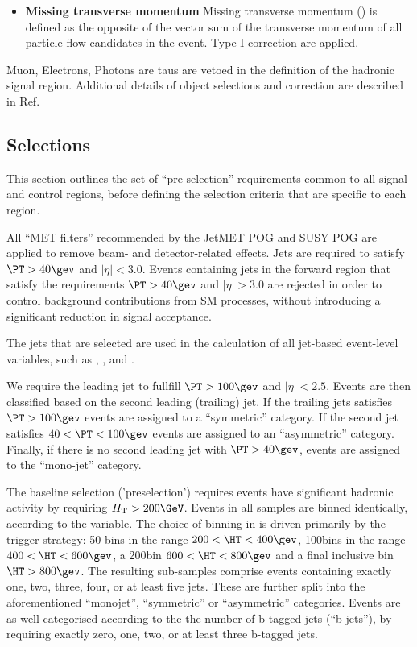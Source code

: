 \begin{itemize}
 \item{\bf Missing transverse momentum} Missing transverse momentum (\met) is defined as the opposite of the vector sum of the transverse momentum of all particle-flow candidates in the event. Type-I \met correction \cite{Khachatryan:2014gga} are applied.


\end{itemize}


Muon, Electrons, Photons are taus are vetoed in the definition of the hadronic signal region. Additional details of object selections and correction are described in Ref.~\cite{alphaTnote}

\subsection{Selections}


This section outlines the set of ``pre-selection'' requirements common to all signal and control regions, before defining the selection criteria that are specific to each region. 


All ``MET filters'' recommended by the JetMET POG and SUSY POG are applied to remove beam- and detector-related effects. Jets are required to satisfy $\PT>40\gev$ and $|\eta|<3.0$. Events containing jets in the forward region that satisfy the requirements $\PT>40\gev$ and $|\eta|>3.0$ are rejected in order to control background contributions from SM processes, without introducing a significant reduction in signal acceptance. 

The jets that are selected are used in the calculation of all jet-based event-level variables, such as \HT, \mht, and \alphat.

We require the leading jet to fullfill $\PT > 100\gev$ and $|\eta|<2.5$.  Events are then classified based on the second leading (trailing) jet. 
If the trailing jets satisfies $\PT > 100\gev$  events are assigned to a ``symmetric'' \njet category. If the second
jet satisfies $40 < \PT < 100\gev$ events are assigned to an ``asymmetric'' \njet category. Finally, if there is no second leading
jet with $\PT>40\gev$, events are assigned to the ``mono-jet'' category. 


The baseline selection ('preselection') requires events have significant hadronic activity by requiring $\scalht > 200\GeV$.  Events in all samples are binned identically, according to the \HT variable. The choice of binning in \HT is driven primarily by the trigger strategy: 50\gev
bins in the range $200 < \HT < 400\gev$, 100\gev bins in the range $400 < \HT < 600\gev$, a 200\gev bin $600<\HT<800\gev$ and a final 
inclusive bin $\HT > 800\gev$. The resulting sub-samples comprise events containing exactly one, two, three, four, or at least five jets. These are further split into the aforementioned  ``monojet'',  ``symmetric'' or ``asymmetric'' \njet categories. Events are as well categorised according to the the number of b-tagged jets (``b-jets''), by requiring exactly zero, one, two, or at least three b-tagged jets. 


